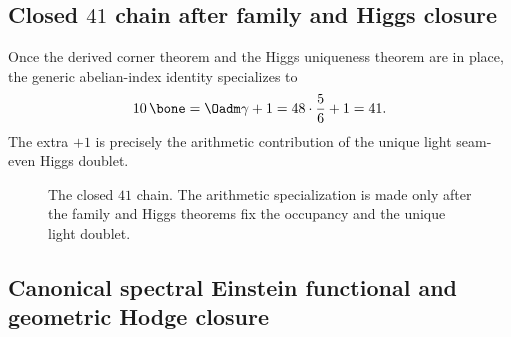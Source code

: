\subsection{Closed \texorpdfstring{$41$}{41} chain after family and Higgs closure}

Once the derived corner theorem and the Higgs uniqueness theorem are in place, the generic
abelian-index identity  specializes to
\begin{equation}
\label{eq:41-chain-specialized}
10\,\bone
=
\Oadm\gamma+1
=
48\cdot\frac56+1
=
41.
\end{equation}
The extra $+1$ is precisely the arithmetic contribution of the unique light seam-even Higgs
doublet.

\begin{figure}[t]
\centering
\footnotesize
{}
\caption{The closed $41$ chain. The arithmetic specialization is made only after the family and
Higgs theorems fix the occupancy and the unique light doublet.}
\label{fig:41-chain-strip}
\end{figure}

\subsection{Canonical spectral Einstein functional and geometric Hodge closure}

